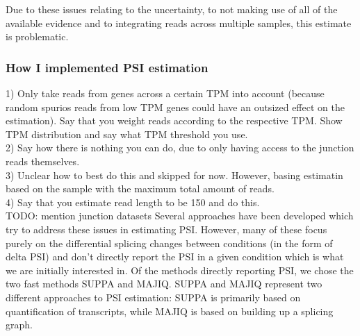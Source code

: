Due to these issues relating to the uncertainty, to not making use of all of the available evidence and to integrating reads across multiple samples, this estimate is problematic.
\subsubsection{How I implemented PSI estimation}

1) Only take reads from genes across a certain TPM into account (because random spurios reads from low TPM genes could have an outsized effect on the estimation). Say that you weight reads according to the respective TPM. Show TPM distribution and say what TPM threshold you use.\\
2) Say how there is nothing you can do, due to only having access to the junction reads themselves. \\
3) Unclear how to best do this and skipped for now. However, basing estimatin based on the sample with the maximum total amount of reads. \\
4) Say that you estimate read length to be 150 and do this. \\
 TODO: mention junction datasets
Several approaches have been developed which try to address these issues in estimating PSI. However, many of these focus purely on the differential splicing changes between conditions (in the form of delta PSI) and don't directly report the PSI in a given condition which is what we are initially interested in. Of the methods directly reporting PSI, we chose the two fast methods SUPPA and MAJIQ. SUPPA and MAJIQ represent two different approaches to PSI estimation: SUPPA is primarily based on quantification of transcripts, while MAJIQ is based on building up a splicing graph.


